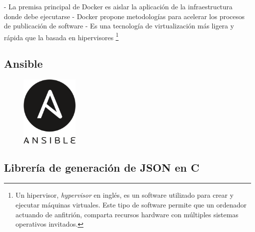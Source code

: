 - La premisa principal de Docker es aislar la aplicación de la infraestructura donde debe ejecutarse
- Docker propone metodologías para acelerar los procesos de publicación de software
- Es una tecnología de virtualización más ligera y rápida que la basada en hipervisores \footnote{Un hipervisor, \emph{hypervisor} en inglés, es un software utilizado para crear y ejecutar máquinas virtuales. Este tipo de software permite que un ordenador actuando de anfitrión, comparta recursos hardware con múltiples sistemas operativos invitados.}

\subsection{Ansible}

\begin{figure}
    \centering
    \includegraphics[width=0.25\textwidth]{imaxes/e-fundamentos-tecnologicos/logo-ansible.png}

\end{figure}

\subsection{Librería de generación de JSON en C}